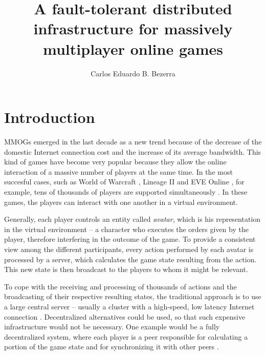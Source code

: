\documentclass[]{usiinfprospectus}
\author{Carlos Eduardo B. Bezerra}
\title{A fault-tolerant distributed infrastructure for massively multiplayer online games}
\begin{document}
\maketitle

\section{Introduction} \label{sec:introduction}

MMOGs emerged in the last decade as a new trend because of the decrease of the domestic Internet connection cost and the increase of its average bandwidth. This kind of games have become very popular because they allow the online interaction of a massive number of players at the same time. In the most succesful cases, such as World of Warcraft \cite{worldofwarcraft}, Lineage II \cite{lineage2} and EVE Online \cite{eveonline}, for example, tens of thousands of players are supported simultaneously \cite{chen2006pch}. In these games, the players can interact with one another in a virtual environment.

Generally, each player controls an entity called \emph{avatar}, which is his representation in the virtual environment -- a character who executes the orders given by the player, therefore interfering in the outcome of the game. To provide a consistent view among the different participants, every action performed by each avatar is processed by a server, which calculates the game state resulting from the action. This new state is then broadcast to the players to whom it might be relevant.%

To cope with the receiving and processing of thousands of actions and the broadcasting of their respective resulting states, the traditional approach is to use a large central server -- usually a cluster with a high-speed, low latency Internet connection \cite{feng2007wnn}. Decentralized alternatives could be used, so that such expensive infrastructure would not be necessary. One example would be a fully decentralized system, where each player is a peer responsible for calculating a portion of the game state and for synchronizing it with other peers \cite{rieche2007ppb, hampel2006ppa, elrhalibi2005abm, iimura2004zfg, knutsson2004pps}.
\end{document}
